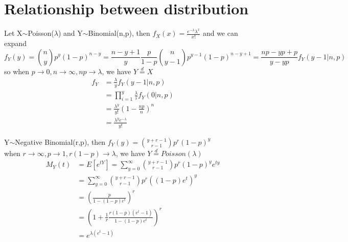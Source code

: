 \documentclass[11pt]{article}
\begin{document}
\section{Relationship between distribution}
\begin{example}
Let X$\sim$Poisson($\lambda$) and Y$\sim$Binomial(n,p), then $f_X(x)=\frac{e^{-\lambda}\lambda^x}{x!}$ and we can expand $$f_Y(y)=\binom{n}{y}p^y(1-p)^{n-y}=\frac{n-y+1}{y}\frac{p}{1-p}\binom{n}{y-1}p^{y-1}(1-p)^{n-y+1}=\frac{np-yp+p}{y-yp}f_Y(y-1|n,p)$$ so when $p\rightarrow 0,n\rightarrow\infty,np\rightarrow\lambda$, we have $Y\overset{d}{=}X$
 \begin{align*}
f_Y&=\frac{\lambda}{y}f_Y(y-1|n,p)\\
&=\prod_{i=1}^y\frac{\lambda}{i}f_Y(0|n,p)\\
&=\frac{\lambda^y}{y!}(1-\frac{np}{n})^n\\
&=\frac{\lambda^ye^{-\lambda}}{y!}
\end{align*}
\end{example}
\begin{example}
Y$\sim$Negative Binomial(r,p), then $f_Y(y)=\binom{y+r-1}{r-1}p^r(1-p)^y$\\
when $r\rightarrow\infty,p\rightarrow 1,r(1-p)\rightarrow\lambda$, we have $Y\overset{d}{=} Poisson(\lambda)$
\begin{align*}
M_Y(t)&=E[e^{tY}]=\sum_{y=0}^\infty\binom{y+r-1}{r-1}p^r(1-p)^ye^{ty}\\
&=\sum_{y=0}^\infty\binom{y+r-1}{r-1}p^r((1-p)e^t)^y\\
&=(\frac{p}{1-(1-p)e^t})^r\\
&=(1+\frac{1}{r}\frac{r(1-p)(e^t-1)}{1-(1-p)e^t})^r\\
&=e^{\lambda(e^t-1)}
\end{align*}
\end{example}
\end{document}
